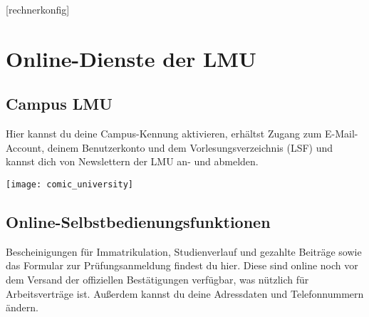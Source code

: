 
\begin{urlList}
	[rechnerkonfig]
\end{urlList}

\section{Online-Dienste der LMU}
\label{sec:online}
\subsection*{Campus LMU}

Hier kannst du deine Campus-Kennung aktivieren, erhältst Zugang zum E-Mail-Account, deinem Benutzerkonto und dem Vorlesungsverzeichnis (LSF) und kannst dich von Newslettern der LMU an- und abmelden.


\begin{urlList}
\end{urlList}

\begin{center}
	{\texttt{[image: comic\_university]}}
\end{center}

\subsection*{Online-Selbstbedienungsfunktionen}

Bescheinigungen für Immatrikulation, Studienverlauf und gezahlte Beiträge sowie das Formular zur Prüfungsanmeldung findest du hier. Diese sind online noch vor dem Versand der offiziellen Bestätigungen verfügbar, was nützlich für Arbeitsverträge ist. Außerdem kannst du deine Adressdaten und Telefonnummern ändern.


